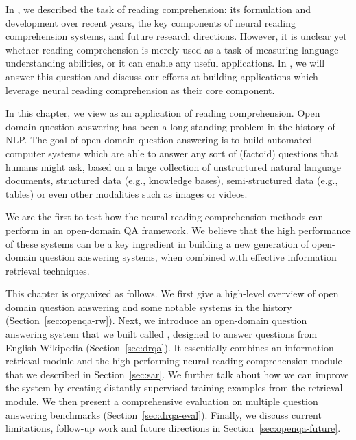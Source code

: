 
In , we described the task of reading comprehension: its formulation and development over recent years, the key components of neural reading comprehension systems, and future research directions. However, it is unclear yet whether reading comprehension is merely used as a task of measuring language understanding abilities, or it can enable any useful applications.  In , we will answer this question and discuss our efforts at building applications which leverage neural reading comprehension as their core component.

In this chapter, we view  as an application of reading comprehension. Open domain question answering has been a long-standing problem in the history of NLP\@. The goal of open domain question answering is to build automated computer systems which are able to answer any sort of (factoid) questions that humans might ask, based on a large collection of unstructured natural language documents, structured data (e.g., knowledge bases), semi-structured data (e.g., tables) or even other modalities such as images or videos.

We are the first to test how the neural reading comprehension methods can perform in an open-domain QA framework. We believe that the high performance of these systems can be a key ingredient in building a new generation of open-domain question answering systems, when combined with effective information retrieval techniques.

This chapter is organized as follows. We first give a high-level overview of open domain question answering and some notable systems in the history (Section~\ref{sec:openqa-rw}). Next, we introduce an open-domain question answering system that we built called , designed to answer questions from English Wikipedia (Section~\ref{sec:drqa}). It essentially combines an information retrieval module and the high-performing neural reading comprehension module that we described in Section~\ref{sec:sar}. We further talk about how we can improve the system by creating distantly-supervised training examples from the retrieval module. We then present a comprehensive evaluation on multiple question answering benchmarks (Section~\ref{sec:drqa-eval}). Finally, we discuss current limitations, follow-up work and future directions in Section~\ref{sec:openqa-future}.

